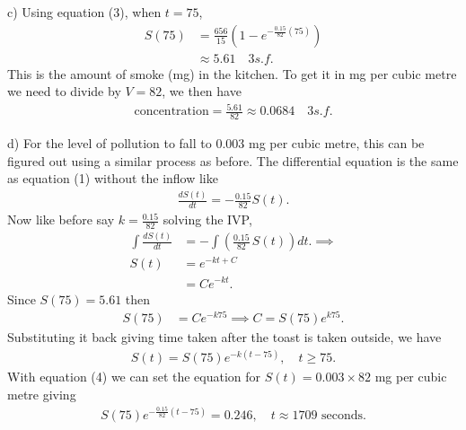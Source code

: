 \documentclass{article}
\begin{document}
c) Using equation (3), when $t = 75$,
\begin{align*}
  S(75) &= \frac{656}{15}(1-e^{-\frac{0.15}{82}(75)}) \\
        &\approx 5.61 \quad 3s.f.
\end{align*}
This is the amount of smoke (mg) in the kitchen. To get
it in mg per cubic metre we need to divide by $V = 82$, we then have 
\begin{align*}
  \text{concentration} = \frac{5.61}{82} \approx 0.0684 \quad 3s.f.
\end{align*}

d) For the level of pollution to fall to 0.003 mg per cubic metre, 
this can be figured out using a similar process as before. The differential equation is the same as 
equation (1) without the inflow like
\begin{align*}
  \frac{dS(t)}{dt} =  - \frac{0.15}{82}S(t).
\end{align*}
Now like before say $k = \frac{0.15}{82}$ solving the IVP,
\begin{align*}
  \int \frac{dS(t)}{dt} &=  -\int \left(\frac{0.15}{82}\,S(t)\right) dt. \implies \\
  S(t) &= e^{-kt + C} \\
  &= C e^{-kt}.
\end{align*}
Since $S(75) = 5.61$ then
\begin{align*}
  S(75)&= C e^{-k75} \implies C = S(75)e^{k75}.
\end{align*}
Substituting it back giving time taken after the toast is taken outside, we have
\begin{align*}
  S(t)= S(75)e^{-k(t-75)}, \quad t \geq 75. \tag{4}
\end{align*}
With equation (4) we can set the equation for 
$S(t) = 0.003 \times 82$ mg per cubic metre giving 
\begin{align*}
   S(75)e^{-\frac{0.15}{82}(t-75)} = 0.246, \quad t \approx 1709 \text{ seconds}.
\end{align*}
\end{document}
